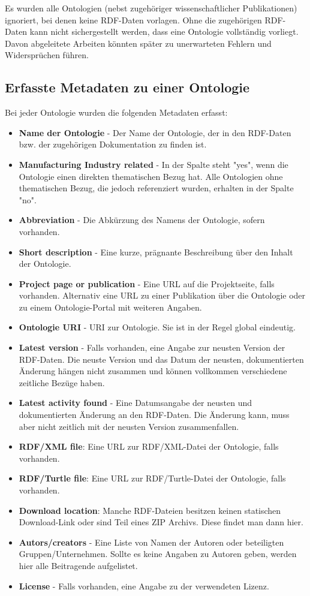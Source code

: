\documentclass{article}
\begin{document}
Es wurden alle Ontologien (nebst zugehöriger wissenschaftlicher Publikationen) ignoriert, bei denen keine RDF-Daten vorlagen.
Ohne die zugehörigen RDF-Daten kann nicht sichergestellt werden, dass eine Ontologie vollständig vorliegt.
Davon abgeleitete Arbeiten könnten später zu unerwarteten Fehlern und Widersprüchen führen.

\subsection{Erfasste Metadaten zu einer Ontologie}

Bei jeder Ontologie wurden die folgenden Metadaten erfasst:

\begin{itemize}
    \item \textbf{Name der Ontologie} - Der Name der Ontologie, der in den RDF-Daten bzw. der zugehörigen Dokumentation zu finden ist.
    \item \textbf{Manufacturing Industry related} - In der Spalte steht "yes", wenn die Ontologie einen direkten thematischen Bezug hat. Alle Ontologien ohne thematischen Bezug, die jedoch referenziert wurden, erhalten in der Spalte "no".
    \item \textbf{Abbreviation} - Die Abkürzung des Namens der Ontologie, sofern vorhanden.
    \item \textbf{Short description} - Eine kurze, prägnante Beschreibung über den Inhalt der Ontologie.
    \item \textbf{Project page or publication} - Eine URL auf die Projektseite, falls vorhanden. Alternativ eine URL zu einer Publikation über die Ontologie oder zu einem Ontologie-Portal mit weiteren Angaben.
    \item \textbf{Ontologie URI} - URI zur Ontologie. Sie ist in der Regel global eindeutig.
    \item \textbf{Latest version} - Falls vorhanden, eine Angabe zur neusten Version der RDF-Daten. Die neuste Version und das Datum der neusten, dokumentierten Änderung hängen nicht zusammen und können vollkommen verschiedene zeitliche Bezüge haben.
    \item \textbf{Latest activity found} - Eine Datumsangabe der neusten und dokumentierten Änderung an den RDF-Daten. Die Änderung kann, muss aber nicht zeitlich mit der neusten Version zusammenfallen.
    \item \textbf{RDF/XML file}: Eine URL zur RDF/XML-Datei der Ontologie, falls vorhanden.
    \item \textbf{RDF/Turtle file}: Eine URL zur RDF/Turtle-Datei der Ontologie, falls vorhanden.
    \item \textbf{Download location}: Manche RDF-Dateien besitzen keinen statischen Download-Link oder sind Teil eines ZIP Archivs. Diese findet man dann hier.
    \item \textbf{Autors/creators} - Eine Liste von Namen der Autoren oder beteiligten Gruppen/Unternehmen. Sollte es keine Angaben zu Autoren geben, werden hier alle Beitragende aufgelistet.
    \item \textbf{License} - Falls vorhanden, eine Angabe zu der verwendeten Lizenz.
\end{itemize}
\end{document}
